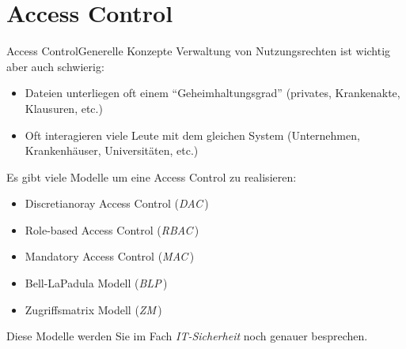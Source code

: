 \documentclass{setbeamer}
\begin{document}
\section{Access Control}

\begin{frame}{Access Control\textemdash Generelle Konzepte}
    Verwaltung von Nutzungsrechten ist wichtig aber auch schwierig:
    \begin{itemize}
        \item Dateien unterliegen oft einem ``Geheimhaltungsgrad'' (privates, Krankenakte, Klausuren, etc.)
        \item Oft interagieren viele Leute mit dem gleichen System (Unternehmen, Krankenhäuser, Universitäten, etc.)
    \end{itemize}

    \pause
    \vspace{0.3cm}

    Es gibt viele Modelle um eine Access Control zu realisieren:
    \begin{itemize}
        \item Discretianoray Access Control (\emph{DAC}\,)
        \item Role-based Access Control (\emph{RBAC}\,)
        \item Mandatory Access Control (\emph{MAC}\,)
        \item Bell-LaPadula Modell (\emph{BLP}\,)
        \item Zugriffsmatrix Modell (\emph{ZM}\,)
    \end{itemize}
    {\Large \MVRightarrow} Diese Modelle werden Sie im Fach \emph{IT-Sicherheit} noch genauer besprechen.
\end{frame}
\end{document}
